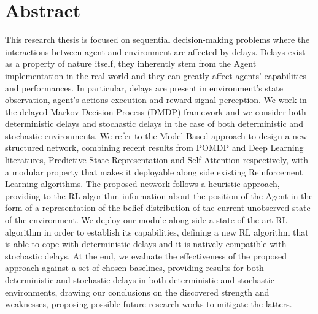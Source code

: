 \chapter*{Abstract}
This research thesis is focused on sequential decision-making
problems where the interactions between agent and environment are affected by delays. Delays exist as a property of nature itself, they inherently stem from the Agent implementation in the real world and they can greatly affect agents' capabilities and performances. In particular, delays are present in environment's state observation, agent's actions execution and reward signal perception. We work in the delayed Markov Decision Process (DMDP) framework and we consider both deterministic delays and stochastic delays in the case of both deterministic and stochastic environments. We refer to the Model-Based approach to design a new structured network, combining recent results from POMDP and Deep Learning literatures, Predictive State Representation and Self-Attention respectively, with a modular property that makes it deployable along side existing Reinforcement Learning algorithms. The proposed network follows a heuristic approach, providing to the RL algorithm information about the position of the Agent in the form of a representation of the belief distribution of the current unobserved state of the environment. We deploy our module along side a state-of-the-art RL algorithm in order to establish its capabilities, defining a new RL algorithm that is able to cope with deterministic delays and it is natively compatible with stochastic delays. At the end, we evaluate the effectiveness of the proposed approach against a set of chosen baselines, providing results for both deterministic and stochastic delays in both deterministic and stochastic environments, drawing our conclusions on the discovered strength and weaknesses, proposing possible future research works to mitigate the latters.